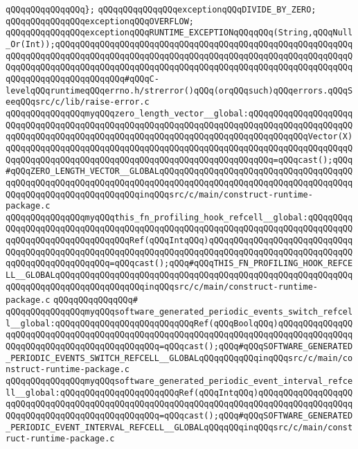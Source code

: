 \verb|qQQqqQQqqQQqqQQq};|\newline
\newline
\verb|qQQqqQQqqQQqqQQqexceptionqQQqDIVIDE_BY_ZERO;|\newline
\verb|qQQqqQQqqQQqqQQqexceptionqQQqOVERFLOW;|\newline
\verb|qQQqqQQqqQQqqQQqexceptionqQQqRUNTIME_EXCEPTIONqQQqqQQq(String,qQQqNull_Or(Int));qQQqqQQqqQQqqQQqqQQqqQQqqQQqqQQqqQQqqQQqqQQqqQQqqQQqqQQqqQQqqQQqqQQqqQQqqQQqqQQqqQQqqQQqqQQqqQQqqQQqqQQqqQQqqQQqqQQqqQQqqQQqqQQqqQQqqQQqqQQqqQQqqQQqqQQqqQQqqQQqqQQqqQQqqQQqqQQqqQQqqQQqqQQqqQQqqQQqqQQqqQQqqQQqqQQqqQQqqQQqqQQq#qQQqC-levelqQQqruntimeqQQqerrno.h/strerror()qQQq(orqQQqsuch)qQQqerrors.qQQqSeeqQQqsrc/c/lib/raise-error.c|\newline
\newline
\verb|qQQqqQQqqQQqqQQqmyqQQqzero_length_vector__global:qQQqqQQqqQQqqQQqqQQqqQQqqQQqqQQqqQQqqQQqqQQqqQQqqQQqqQQqqQQqqQQqqQQqqQQqqQQqqQQqqQQqqQQqqQQqqQQqqQQqqQQqqQQqqQQqqQQqqQQqqQQqqQQqqQQqqQQqqQQqqQQqqQQqqQQqVector(X)qQQqqQQqqQQqqQQqqQQqqQQqqQQqqQQqqQQqqQQqqQQqqQQqqQQqqQQqqQQqqQQqqQQqqQQqqQQqqQQqqQQqqQQqqQQqqQQqqQQqqQQqqQQqqQQqqQQqqQQqqQQq=qQQqcast();qQQq#qQQqZERO_LENGTH_VECTOR__GLOBALqQQqqQQqqQQqqQQqqQQqqQQqqQQqqQQqqQQqqQQqqQQqqQQqqQQqqQQqqQQqqQQqqQQqqQQqqQQqqQQqqQQqqQQqqQQqqQQqqQQqqQQqqQQqqQQqqQQqqQQqqQQqqQQqqQQqqQQqinqQQqsrc/c/main/construct-runtime-package.c|\newline
\verb|qQQqqQQqqQQqqQQqmyqQQqthis_fn_profiling_hook_refcell__global:qQQqqQQqqQQqqQQqqQQqqQQqqQQqqQQqqQQqqQQqqQQqqQQqqQQqqQQqqQQqqQQqqQQqqQQqqQQqqQQqqQQqqQQqqQQqqQQqqQQqqQQqRef(qQQqIntqQQq)qQQqqQQqqQQqqQQqqQQqqQQqqQQqqQQqqQQqqQQqqQQqqQQqqQQqqQQqqQQqqQQqqQQqqQQqqQQqqQQqqQQqqQQqqQQqqQQqqQQqqQQqqQQqqQQqqQQqqQQq=qQQqcast();qQQq#qQQqTHIS_FN_PROFILING_HOOK_REFCELL__GLOBALqQQqqQQqqQQqqQQqqQQqqQQqqQQqqQQqqQQqqQQqqQQqqQQqqQQqqQQqqQQqqQQqqQQqqQQqqQQqqQQqqQQqqQQqinqQQqsrc/c/main/construct-runtime-package.c|\newline
\verb|qQQqqQQqqQQqqQQq#|\newline
\verb|qQQqqQQqqQQqqQQqmyqQQqsoftware_generated_periodic_events_switch_refcell__global:qQQqqQQqqQQqqQQqqQQqqQQqqQQqRef(qQQqBoolqQQq)qQQqqQQqqQQqqQQqqQQqqQQqqQQqqQQqqQQqqQQqqQQqqQQqqQQqqQQqqQQqqQQqqQQqqQQqqQQqqQQqqQQqqQQqqQQqqQQqqQQqqQQqqQQqqQQqqQQq=qQQqcast();qQQq#qQQqSOFTWARE_GENERATED_PERIODIC_EVENTS_SWITCH_REFCELL__GLOBALqQQqqQQqqQQqinqQQqsrc/c/main/construct-runtime-package.c|\newline
\verb|qQQqqQQqqQQqqQQqmyqQQqsoftware_generated_periodic_event_interval_refcell__global:qQQqqQQqqQQqqQQqqQQqqQQqRef(qQQqIntqQQq)qQQqqQQqqQQqqQQqqQQqqQQqqQQqqQQqqQQqqQQqqQQqqQQqqQQqqQQqqQQqqQQqqQQqqQQqqQQqqQQqqQQqqQQqqQQqqQQqqQQqqQQqqQQqqQQqqQQqqQQq=qQQqcast();qQQq#qQQqSOFTWARE_GENERATED_PERIODIC_EVENT_INTERVAL_REFCELL__GLOBALqQQqqQQqinqQQqsrc/c/main/construct-runtime-package.c|\newline
